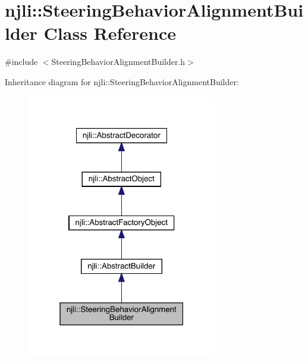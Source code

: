 \hypertarget{classnjli_1_1_steering_behavior_alignment_builder}{}\section{njli\+:\+:Steering\+Behavior\+Alignment\+Builder Class Reference}
\label{classnjli_1_1_steering_behavior_alignment_builder}


{\ttfamily \#include $<$Steering\+Behavior\+Alignment\+Builder.\+h$>$}



Inheritance diagram for njli\+:\+:Steering\+Behavior\+Alignment\+Builder\+:\nopagebreak
\begin{figure}[H]
\begin{center}
\leavevmode
\includegraphics[width=235pt]{classnjli_1_1_steering_behavior_alignment_builder__inherit__graph}
\end{center}
\end{figure}


